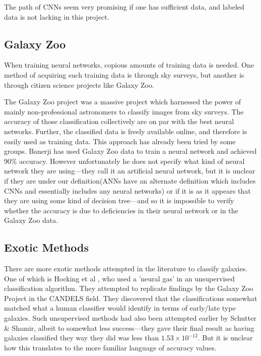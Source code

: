 \documentclass[a4paper,11pt]{article}
\begin{document}
The path of CNNs seem very promising if one has sufficient data, and labeled data is not lacking in this project. 

\subsection{Galaxy Zoo}
When training neural networks, copious amounts of training data is needed. One method of acquiring such training data is through sky surveys, but another is through citizen science projects like Galaxy Zoo. \cite{lintott_2008_galaxy}

The Galaxy Zoo project was a massive project which harnessed the power of mainly non-professional astronomers to classify images from sky surveys. The accuracy of those classification collectively are on par with the best neural networks. Further, the classified data is freely available online, and therefore is easily used as training data. This approach has already been tried by some groups. Banerji has used Galaxy Zoo data to train a neural network and achieved 90\% accuracy. \cite{banerji_2010_galaxy} However unfortunately he does not specify what kind of neural network they are using—they call it an artificial neural network, but it is unclear if they are under our definition(ANNs have an alternate definition which includes CNNs and essentially includes any neural networks) or if it is as it appears that they are using some kind of decision tree—and so it is impossible to verify whether the accuracy is due to deficiencies in their neural network or in the Galaxy Zoo data. 

\subsection{Exotic Methods}
There are more exotic methods attempted in the literature to classify galaxies. One of which is Hocking et al \cite{hocking_2017_an} , who used a 'neural gas' in an unsupervised classification algorithm. They attempted to replicate findings by the Galaxy Zoo Project in the CANDELS field. They discovered that the classifications somewhat matched what a human classifier would identify in terms of early/late type galaxies. Such unsupervised methods had also been attempted earlier by Schutter \& Shamir, \cite{schutter_2015_galaxy} albeit to somewhat less success—they gave their final result as having galaxies classified they way they did was less than $1.53 \times 10^{-12}$. But it is unclear how this translates to the more familiar language of accuracy values.
\end{document}
